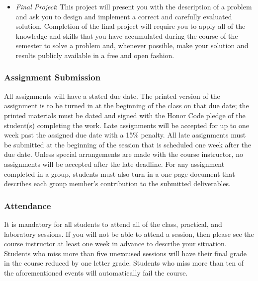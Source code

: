 \begin{itemize}
  \item {\em Final Project}: This project will present you with the description of a problem and ask you to design
    and implement a correct and carefully evaluated solution. Completion of the final project will require you to
    apply all of the knowledge and skills that you have accumulated during the course of the semester to solve a
    problem and, whenever possible, make your solution and results publicly available in a free and open fashion.

\end{itemize}

\subsubsection*{Assignment Submission}

All assignments will have a stated due date. The printed version of the assignment is to be turned in at the beginning
of the class on that due date; the printed materials must be dated and signed with the Honor Code pledge of the
student(s) completing the work.  Late assignments will be accepted for up to one week past the assigned due date with a
15\% penalty. All late assignments must be submitted at the beginning of the session that is scheduled one week after
the due date. Unless special arrangements are made with the course instructor, no assignments will be accepted after the
late deadline. For any assignment completed in a group, students must also turn in a one-page document that describes
each group member's contribution to the submitted deliverables.  

\subsubsection*{Attendance}

It is mandatory for all students to attend all of the class, practical, and laboratory sessions. If you will not be able
to attend a session, then please see the course instructor at least one week in advance to describe your situation.
Students who miss more than five unexcused sessions will have their final grade in the course reduced by one letter
grade. Students who miss more than ten of the aforementioned events will automatically fail the course.

% 
% 

